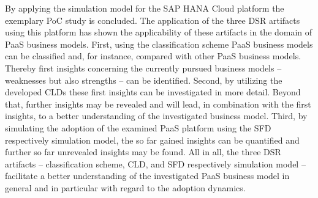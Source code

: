 By applying the simulation model for the SAP HANA Cloud platform the exemplary \ac{PoC} study is concluded. The application of the three \ac{DSR} artifacts using this platform has shown the applicability of these artifacts in the domain of \ac{PaaS} business models. First, using the classification scheme \ac{PaaS} business models can be classified and, for instance, compared with other \ac{PaaS} business models. Thereby first insights concerning the currently pursued business models -- weaknesses but also strengths -- can be identified. Second, by utilizing the developed \acp{CLD} these first insights can be investigated in more detail. Beyond that, further insights may be revealed and will lead, in combination with the first insights, to a better understanding of the investigated business model. Third, by simulating the adoption of the examined \ac{PaaS} platform using the \ac{SFD} respectively simulation model, the so far gained insights can be quantified and further so far unrevealed insights may be found. All in all, the three \ac{DSR} artifacts -- classification scheme, \ac{CLD}, and \ac{SFD} respectively simulation model -- facilitate a better understanding of the investigated \ac{PaaS} business model in general and in particular with regard to the adoption dynamics.

\begin{comment}
	\begin{figure}[htb]
		\centering
		
		\caption{Proof of Concept Simulation -- Customers}
	\end{figure}

	\begin{figure}[htb]
		\centering
		
		\caption{Proof of Concept Simulation -- Potential Customers}
	\end{figure}
\end{comment}